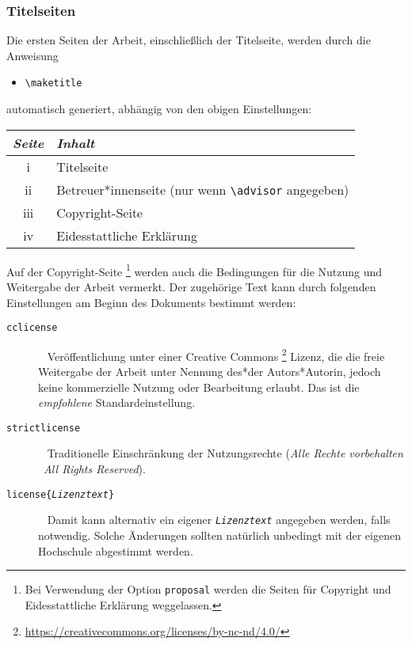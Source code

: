 \subsubsection{Titelseiten}

Die ersten Seiten der Arbeit, einschließlich der Titelseite, werden durch die
Anweisung
%
\begin{itemize}
    \item[] \verb!\maketitle!
\end{itemize}
%
automatisch generiert, abhängig von den obigen Einstellungen:
%
\begin{center}
    \begin{tabular}{@{}cl@{}}
        \toprule
        \emph{Seite} & \emph{Inhalt} \\
        \midrule
        \textrm{i}   & Titelseite \\
        \textrm{ii}  & Betreuer*innenseite (nur wenn \verb!\advisor!
                       angegeben) \\
        \textrm{iii} & Copyright-Seite\\
        \textrm{iv}  & Eidesstattliche Erklärung\\
        \bottomrule
    \end{tabular}
\end{center}
%
Auf der Copyright-Seite%
\footnote{Bei Verwendung der Option \texttt{proposal} werden die Seiten für
Copyright und Eidesstattliche Erklärung weggelassen.}
werden auch die Bedingungen für die Nutzung und
Weitergabe der Arbeit vermerkt. Der zugehörige Text kann durch folgenden
Einstellungen am Beginn des Dokuments bestimmt werden:
%
\begin{description}
    \item[\normalfont\texttt{{\bs}cclicense}] ~ \newline
    Veröffentlichung unter einer Creative Commons%
    \footnote{\url{https://creativecommons.org/licenses/by-nc-nd/4.0/}}
    Lizenz, die die freie Weitergabe der Arbeit unter Nennung des*der
    Autors*Autorin, jedoch keine kommerzielle Nutzung oder Bearbeitung erlaubt.
    Das ist die \emph{empfohlene} Standardeinstellung.
    \item[\normalfont\texttt{{\bs}strictlicense}] ~ \newline
    Traditionelle Einschränkung der Nutzungsrechte
    (\emph{Alle Rechte vorbehalten} \bzw\ \emph{All Rights Reserved}).
    \item[\normalfont\texttt{{\bs}license\{\emph{Lizenztext}\}}] ~ \newline
    Damit kann alternativ ein eigener \texttt{\emph{Lizenztext}} angegeben
    werden, falls notwendig. Solche Änderungen sollten natürlich unbedingt
    mit der eigenen Hochschule abgestimmt werden.
\end{description}

